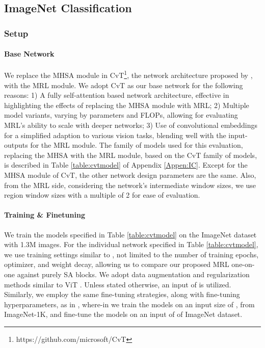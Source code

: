 \documentclass{article}
\begin{document}
\subsection{ImageNet Classification}\label{subsec:imagenet}

\subsubsection{Setup}
\paragraph{Base Network} We replace the MHSA module in CvT\footnote{https://github.com/microsoft/CvT}, the network architecture proposed by \cite{DBLP:journals/corr/CvT}, with the MRL module. We adopt CvT as our base network for the following reasons: 1) A fully self-attention based network architecture, effective in highlighting the effects of replacing the MHSA module with MRL; 2) Multiple model variants, varying by parameters and FLOPs, allowing for evaluating MRL's ability to scale with deeper networks; 3) Use of convolutional embeddings for a simplified adaption to various vision tasks, blending well with the input-outputs for the MRL module. The family of models used for this evaluation, replacing the MHSA with the MRL module, based on the CvT family of models, is described in Table \ref{table:cvtmodel} of Appendix \ref{Appen:IC}. Except for the MHSA module of CvT, the other network design parameters are the same. Also, from the MRL side, considering the network's intermediate window sizes, we use region window sizes with a multiple of 2 for ease of evaluation. 
\vspace{-4mm}
\paragraph{Training \& Finetuning} We train the models specified in Table \ref{table:cvtmodel} on the ImageNet dataset with 1.3M images. For the individual network specified in Table \ref{table:cvtmodel}, we use training settings similar to \cite{DBLP:journals/corr/CvT}, not limited to the number of training epochs, optimizer, and weight decay, allowing us to compare our proposed MRL one-on-one against purely SA blocks. We adopt data augmentation and regularization methods similar to ViT \cite{ViT}. Unless stated otherwise, an input of  is utilized. 
Similarly, we employ the same fine-tuning strategies, along with fine-tuning hyperparameters, as in \cite{DBLP:journals/corr/CvT}, where-in we train the models on an input size of , from ImageNet-1K, and fine-tune the models on an input of  of ImageNet dataset. 
\end{document}
